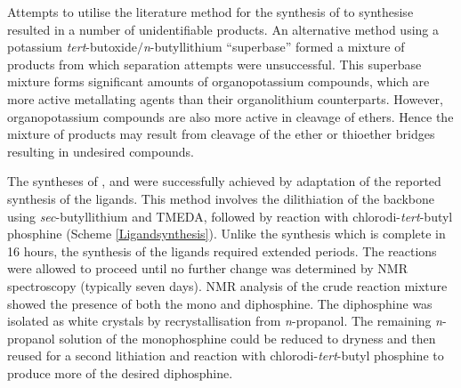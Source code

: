 Attempts to utilise the literature method for the synthesis of \tBuxantphos{}\cite{Mispelaere2005} to synthesise \tButhixantphos{} resulted in a number of unidentifiable products.  An alternative method using a potassium \emph{tert}-butoxide$/$\emph{n}-butyllithium ``superbase'' formed a mixture of products from which separation attempts were unsuccessful.  This superbase mixture forms significant amounts of organopotassium compounds, which are more active metallating agents than their organolithium counterparts.  However, organopotassium compounds are also more active in cleavage of ethers.\cite{Bhatt1983}  Hence the mixture of products may result from cleavage of the ether or thioether bridges resulting in undesired compounds.


The syntheses of \tButhixantphos{}, \tBusixantphos{} and \tBuxantphos{} were successfully achieved by adaptation of the reported synthesis of the \Phxantphos{} ligands\cite{Kranenburg1995}.  This method involves the dilithiation of the backbone using \emph{sec}-butyl\-lithium and \gls{TMEDA}, followed by reaction with chlorodi-\emph{tert}-butyl phosphine (Scheme \ref{Ligandsynthesis}).  Unlike the \Phxantphos{} synthesis which is complete in 16 hours, the synthesis of the \tBu{} ligands required extended periods.  The reactions were allowed to proceed until no further change was determined by NMR spectroscopy (typically seven days).  NMR analysis of the crude reaction mixture showed the presence of both the mono and diphosphine.  The diphosphine was isolated as white crystals by recrystallisation from \emph{n}-propanol.  The remaining \emph{n}-propanol solution of the monophosphine could be reduced to dryness and then reused for a second lithiation and reaction with chlorodi-\emph{tert}-butyl phosphine to produce more of the desired diphosphine.  


